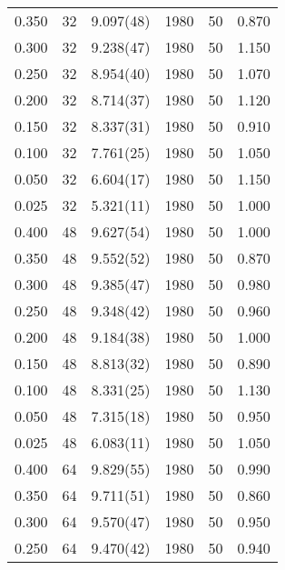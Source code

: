 \begin{tabular}{rrlrrr}
 0.350 &      32 & 9.097(48)  &                1980 &                  50 &    0.870 \\
 0.300 &      32 & 9.238(47)  &                1980 &                  50 &    1.150 \\
 0.250 &      32 & 8.954(40)  &                1980 &                  50 &    1.070 \\
 0.200 &      32 & 8.714(37)  &                1980 &                  50 &    1.120 \\
 0.150 &      32 & 8.337(31)  &                1980 &                  50 &    0.910 \\
 0.100 &      32 & 7.761(25)  &                1980 &                  50 &    1.050 \\
 0.050 &      32 & 6.604(17)  &                1980 &                  50 &    1.150 \\
 0.025 &      32 & 5.321(11)  &                1980 &                  50 &    1.000 \\
 0.400 &      48 & 9.627(54)  &                1980 &                  50 &    1.000 \\
 0.350 &      48 & 9.552(52)  &                1980 &                  50 &    0.870 \\
 0.300 &      48 & 9.385(47)  &                1980 &                  50 &    0.980 \\
 0.250 &      48 & 9.348(42)  &                1980 &                  50 &    0.960 \\
 0.200 &      48 & 9.184(38)  &                1980 &                  50 &    1.000 \\
 0.150 &      48 & 8.813(32)  &                1980 &                  50 &    0.890 \\
 0.100 &      48 & 8.331(25)  &                1980 &                  50 &    1.130 \\
 0.050 &      48 & 7.315(18)  &                1980 &                  50 &    0.950 \\
 0.025 &      48 & 6.083(11)  &                1980 &                  50 &    1.050 \\
 0.400 &      64 & 9.829(55)  &                1980 &                  50 &    0.990 \\
 0.350 &      64 & 9.711(51)  &                1980 &                  50 &    0.860 \\
 0.300 &      64 & 9.570(47)  &                1980 &                  50 &    0.950 \\
 0.250 &      64 & 9.470(42)  &                1980 &                  50 &    0.940 \\

\end{tabular}
